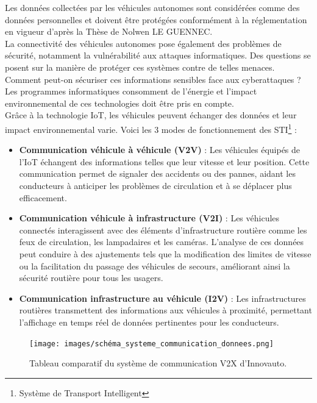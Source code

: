 Les données collectées par les véhicules autonomes sont considérées comme des données personnelles et doivent être protégées conformément à la réglementation en vigueur d'après la Thèse de Nolwen LE GUENNEC\cite{le_gennec_machine_2023}.\\
La connectivité des véhicules autonomes pose également des problèmes de sécurité, notamment la vulnérabilité aux attaques informatiques. Des questions se posent sur la manière de protéger ces systèmes contre de telles menaces. Comment peut-on sécuriser ces informations sensibles face aux cyberattaques ?\\
Les programmes informatiques consomment de l’énergie et l'impact environnemental de ces technologies doit être pris en compte.\\
Grâce à la technologie IoT, les véhicules peuvent échanger des données et leur impact environnemental varie. Voici les 3 modes de fonctionnement des STI\footnote{Système de Transport Intelligent} :
\begin{itemize}
    \item \textbf{Communication véhicule à véhicule (V2V)} : Les véhicules équipés de l’IoT échangent des informations telles que leur vitesse et leur position. Cette communication permet de signaler des accidents ou des pannes, aidant les conducteurs à anticiper les problèmes de circulation et à se déplacer plus efficacement.
    \item \textbf{Communication véhicule à infrastructure (V2I)} : Les véhicules connectés interagissent avec des éléments d’infrastructure routière comme les feux de circulation, les lampadaires et les caméras. L’analyse de ces données peut conduire à des ajustements tels que la modification des limites de vitesse ou la facilitation du passage des véhicules de secours, améliorant ainsi la sécurité routière pour tous les usagers.
    \item \textbf{Communication infrastructure au véhicule (I2V)} : Les infrastructures routières transmettent des informations aux véhicules à proximité, permettant l’affichage en temps réel de données pertinentes pour les conducteurs.
\end{itemize}

\begin{figure}[H]
    \centering
    \texttt{[image: images/schéma\_systeme\_communication\_donnees.png]} 
    \caption{Tableau comparatif du système de communication V2X d'Innovauto.}
\end{figure}

